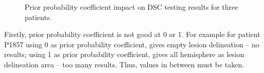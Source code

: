 \documentclass[12pt]{article}
\begin{document}
\begin{figure}[!htb]
\centering
{}


\caption{Prior probability coefficient impact on DSC testing results for three patients.}
\label{fig:priors}
\end{figure}

Firstly, prior probability coefficient is not good at 0 or 1. For example for patient P1857 using 0 as prior probability coefficient, gives empty lesion delineation – no results; using 1 as prior probability coefficient, gives all hemisphere as lesion delineation area – too many results. Thus, values in between must be taken. 
\end{document}
